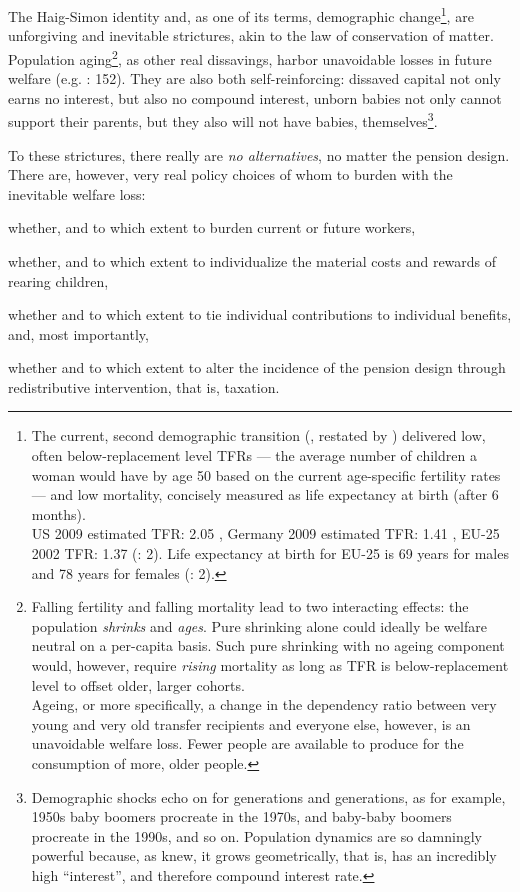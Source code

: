 \documentclass[11pt,a4paper,oneside,openright]{article}
\begin{document}
The Haig-Simon identity and, as one of its terms, demographic change\footnote{
	The current, second demographic transition (\citealt{Davis1945}, restated by \citealt{Caldwell-1976-aa}) delivered low, often below-replacement level \glspl{TFR} --- the average number of children a woman would have by age 50 based on the current age-specific fertility rates --- and low mortality, concisely measured as life expectancy at birth (after 6 months). \\ 
	US 2009 estimated TFR: 2.05 \citep{CIA2009}, Germany 2009 estimated TFR: 1.41 \citep{CIA2009}, EU-25 2002 TFR: 1.37 (\citealt{Demeny-2003-aa}: 2). Life expectancy at birth for EU-25 is 69 years for males and 78 years for females (\citealt{Demeny-2003-aa}: 2).}, 
are unforgiving and inevitable strictures, akin to the law of conservation of matter. Population aging\footnote{
	Falling fertility and falling mortality lead to two interacting effects: the population \emph{shrinks} and \emph{ages}. Pure shrinking alone could ideally be welfare neutral on a per-capita basis. Such pure shrinking with no ageing component would, however, require \emph{rising} mortality as long as TFR is below-replacement level to offset older, larger cohorts.\\
	Ageing, or more specifically, a change in the dependency ratio between very young and very old transfer recipients and everyone else, however, is an unavoidable welfare loss. Fewer people are available to produce for the consumption of more, older people.},
as other real dissavings, harbor unavoidable losses in future welfare (e.g. \citealt{Borsch-Supan2003}: 152). They are also both self-reinforcing: dissaved capital not only earns no interest, but also no compound interest, unborn babies not only cannot support their parents, but they also will not have babies, themselves\footnote{
	Demographic shocks echo on for generations and generations, as for example, 1950s baby boomers procreate in the 1970s, and baby-baby boomers procreate in the 1990s, and so on. Population dynamics are so damningly powerful because, as \cite{Malthus1798} knew, it grows geometrically, that is, has an incredibly high ``interest'', and therefore compound interest rate.}.

To these strictures, there really are \emph{no alternatives}, no matter the pension design. There are, however, very real policy choices of whom to burden with the inevitable welfare loss: \begin{inparaenum} \item whether, and to which extent to burden current or future workers, \item whether, and to which extent to individualize the material costs and rewards of rearing children, \item whether and to which extent to tie individual contributions to individual benefits, and, most importantly, \item whether and to which extent to alter the incidence of the pension design through redistributive intervention, that is, taxation. \end{inparaenum}
\end{document}
